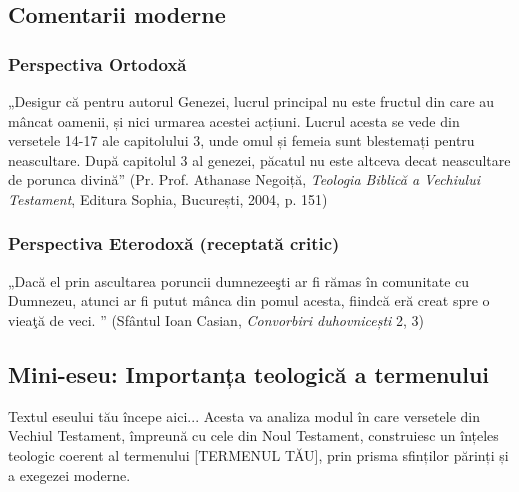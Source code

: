 \subsection{Comentarii moderne}

\subsubsection{Perspectiva Ortodoxă}
\begin{displayquote}
    „Desigur că pentru autorul Genezei, lucrul principal nu este fructul din care au mâncat oamenii, și nici urmarea acestei acțiuni.
    Lucrul acesta se vede din versetele 14-17 ale capitolului 3, unde omul
    și femeia sunt blestemați pentru neascultare. După  capitolul 3 al
    genezei, păcatul nu este altceva decat neascultare de porunca divină”
    (Pr. Prof. Athanase Negoiță,
    \textit{Teologia Biblică a Vechiului Testament},
    Editura Sophia,
    București, 2004, p. 151)
\end{displayquote}

\subsubsection{Perspectiva Eterodoxă (receptată critic)}
\begin{displayquote}
    „Dacă el prin ascultarea poruncii dumnezeeşti ar fi rămas în comunitate
    cu Dumnezeu, atunci ar fi putut mânca din pomul acesta, fiindcă eră creat
    spre o vieaţă de veci. ” (Sfântul Ioan Casian, \textit{Convorbiri duhovnicești} 2, 3)
\end{displayquote}

\subsection{Mini-eseu: Importanța teologică a termenului}
Textul eseului tău începe aici...
Acesta va analiza modul în care versetele din Vechiul Testament, împreună cu cele din Noul Testament, construiesc un înțeles teologic coerent al termenului [TERMENUL TĂU], prin prisma sfinților părinți și a exegezei moderne.
